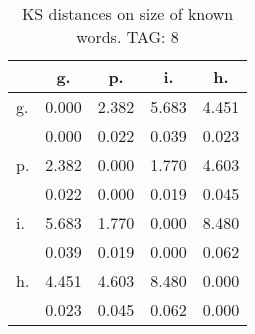 \begin{table}[h!]
\begin{center}
\begin{tabular}{| l | c | c | c | c |}\hline
 & g. & p. & i. & h. \\\hline
g. & 0.000  & 2.382  & 5.683  & 4.451 \\\hline
 & 0.000  & 0.022  & 0.039  & 0.023 \\\hline
p. & 2.382  & 0.000  & 1.770  & 4.603 \\\hline
 & 0.022  & 0.000  & 0.019  & 0.045 \\\hline
i. & 5.683  & 1.770  & 0.000  & 8.480 \\\hline
 & 0.039  & 0.019  & 0.000  & 0.062 \\\hline
h. & 4.451  & 4.603  & 8.480  & 0.000 \\\hline
 & 0.023  & 0.045  & 0.062  & 0.000 \\\hline
\end{tabular}
\caption{KS distances on size of known words. TAG: 8}
\end{center}
\end{table}